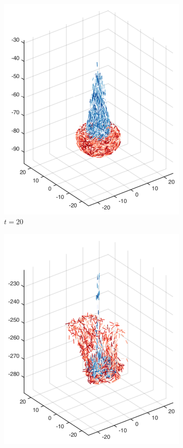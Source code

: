 \begin{figure}[htbp]
\begin{subfigure}[h]{0.24\textwidth}
    \includegraphics[width=\textwidth]{img/mixing/random_00020.pdf}
    \caption{$t=20$}\label{fig:mixing_random_b}
  \end{subfigure}
  \begin{subfigure}[h]{0.24\textwidth}
    \centering
    \includegraphics[width=\textwidth]{img/mixing/random_00100.pdf}

\end{subfigure}
\end{figure}
